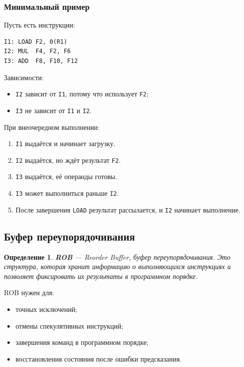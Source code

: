 \documentclass[12pt,a4paper]{article}
\newtheorem{definition}{Определение}
\begin{document}
\subsubsection{Минимальный пример}

Пусть есть инструкции:

\begin{lstlisting}
I1: LOAD F2, 0(R1)
I2: MUL  F4, F2, F6
I3: ADD  F8, F10, F12
\end{lstlisting}

Зависимости:

\begin{itemize}
    \item \texttt{I2} зависит от \texttt{I1}, потому что использует \texttt{F2};
    \item \texttt{I3} не зависит от \texttt{I1} и \texttt{I2}.
\end{itemize}

При внеочередном выполнении:

\begin{enumerate}
    \item \texttt{I1} выдаётся и начинает загрузку.
    \item \texttt{I2} выдаётся, но ждёт результат \texttt{F2}.
    \item \texttt{I3} выдаётся, её операнды готовы.
    \item \texttt{I3} может выполниться раньше \texttt{I2}.
    \item После завершения \texttt{LOAD} результат рассылается, и \texttt{I2} начинает выполнение.
\end{enumerate}

\subsection{Буфер переупорядочивания}

\begin{definition}
\textbf{ROB} --- Reorder Buffer, буфер переупорядочивания. Это структура, которая хранит информацию о выполняющихся инструкциях и позволяет фиксировать их результаты в программном порядке.
\end{definition}

ROB нужен для:

\begin{itemize}
    \item точных исключений;
    \item отмены спекулятивных инструкций;
    \item завершения команд в программном порядке;
    \item восстановления состояния после ошибки предсказания.
\end{itemize}
\end{document}
